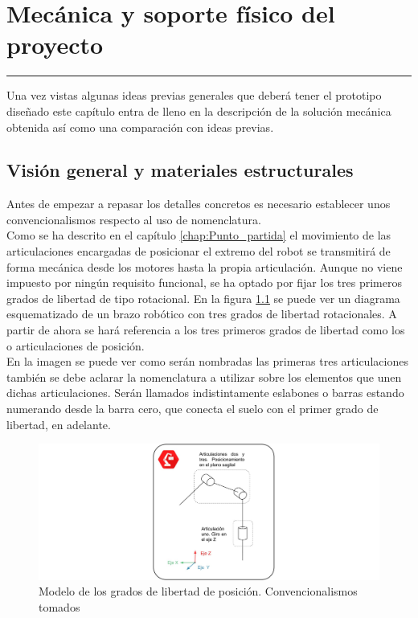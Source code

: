 \chapter{Mecánica y soporte físico del proyecto} \label{chap:Mecanica}
\hrule
\vspace{3mm}

Una vez vistas algunas ideas previas generales que deberá tener el prototipo diseñado este capítulo entra de lleno en la descripción de la solución mecánica obtenida así como una comparación con ideas previas.

\section{Visión general y materiales estructurales} \label{sec:Mecanica:vision_general}

    Antes de empezar a repasar los detalles concretos es necesario establecer unos convencionalismos respecto al uso de nomenclatura.
    \\

    Como se ha descrito en el capítulo \ref{chap:Punto_partida} el movimiento de las articulaciones encargadas de posicionar el extremo del robot se transmitirá de forma mecánica desde los motores hasta la propia articulación. Aunque no viene impuesto por ningún requisito funcional, se ha optado por fijar los tres primeros grados de libertad de tipo rotacional. En la figura \ref{fig:Mecanica:convenciones_generales} se puede ver un diagrama esquematizado de un brazo robótico con tres grados de libertad rotacionales. A partir de ahora se hará referencia a los tres primeros grados de libertad como los  o articulaciones de posición.
    \\

    En la imagen se puede ver como serán nombradas las primeras tres articulaciones también se debe aclarar la nomenclatura a utilizar sobre los elementos que unen dichas articulaciones. Serán llamados indistintamente eslabones o barras estando numerando desde la barra cero, que conecta el suelo con el primer grado de libertad, en adelante.

    \begin{figure}[H]
        \centering
        \includegraphics[width=\textwidth]{figuras/Imagenes_Mecanica/modelo_esquematico.jpg}
        \caption{Modelo de los grados de libertad de posición. Convencionalismos tomados}
        \label{fig:Mecanica:convenciones_generales}
    \end{figure}

